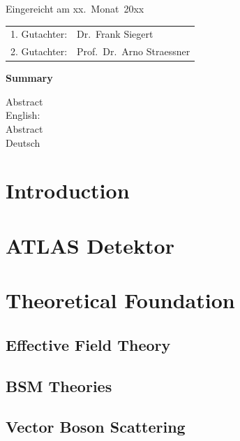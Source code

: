 \thispagestyle{empty}\vspace*{48em}

Eingereicht am xx.~Monat~20xx\vspace{1.5em}
\par{\large\begin{tabular}{ll}
        1. Gutachter: & Dr.~Frank Siegert         \\
        2. Gutachter: & Prof.~Dr.~Arno Straessner \\
    \end{tabular}}


\newpage
\begin{center}\large\bfseries Summary\end{center}


Abstract \\
English: \\

\vspace{20em}
Abstract \\
Deutsch \\


\tableofcontents

\chapter{Introduction}

\chapter{ATLAS Detektor}


\chapter{Theoretical Foundation}
\section{Effective Field Theory}


\section{BSM Theories}


\section{Vector Boson Scattering}


